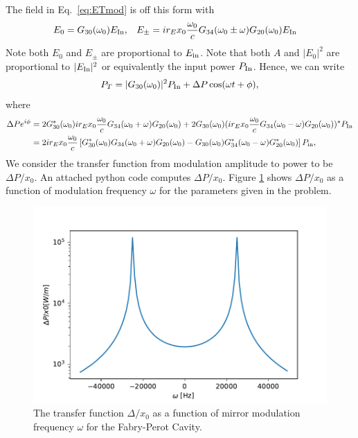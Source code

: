 \documentclass[11pt]{article}
\begin{document}
\begin{enumerate}
\begin{itemize}
The field in Eq.~\eqref{eq:ETmod} is off this form with 
\begin{align}
&E_0=G_{30}(\omega_0)E_{\rm In},& &E_{\pm}=ir_Ex_0\frac{\omega_0}{c}G_{34}(\omega_0\pm \omega)G_{20}(\omega_0)E_{\rm In}&
\end{align}
Note both $E_0$ and $E_{\pm}$ are proportional to $E_{\rm in}$. Note that both $A$ and $|E_0|^2$ are proportional to $|E_{\rm In}|^2$ or equivalently the input power $P_{\rm In}$. Hence, we can write
\begin{align}
P_T=|G_{30}(\omega_0)|^2P_{\rm In}+\Delta P\cos(\omega t+\phi),
\end{align}
where 
\begin{align}
\Delta P e^{i\phi}&=2G^*_{30}(\omega_0)ir_Ex_0\frac{\omega_0}{c}G_{34}(\omega_0+\omega)G_{20}(\omega_0)+2G_{30}(\omega_0)(ir_Ex_0\frac{\omega_0}{c}G_{34}(\omega_0-\omega)G_{20}(\omega_0))^*P_{\rm In} \nonumber \\
&=2ir_Ex_0\frac{\omega_0}{c}\left[G^*_{30}(\omega_0)G_{34}(\omega_0+\omega)G_{20}(\omega_0)-G_{30}(\omega_0)G^*_{34}(\omega_0-\omega)G^*_{20}(\omega_0)\right]P_{\rm in},
\end{align}
We consider the transfer function from modulation amplitude to power to be $\Delta P/x_0$. An attached python code computes $\Delta P/x_0$. Figure \ref{fig:2b} shows  $\Delta P/x_0$ as a function of modulation frequency $\omega$ for the parameters given in the problem.

\begin{figure}[h]
\includegraphics[width =1\columnwidth]{2b}
\caption{The transfer function $\Delta /x_0$ as a function of mirror modulation frequency $\omega$ for the Fabry-Perot Cavity.
}
\label{fig:2b}
\end{figure}


\end{itemize}
\end{enumerate}
\end{document}
